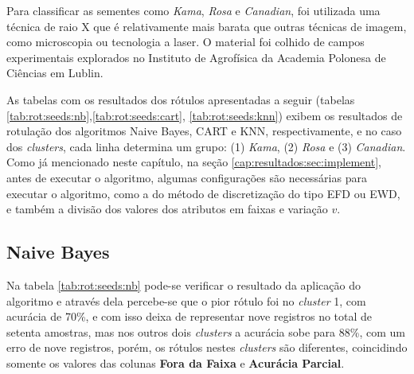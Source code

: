 Para classificar as sementes como \textit{Kama}, \textit{Rosa} e \textit{Canadian}, foi utilizada uma técnica de raio X que é relativamente mais barata que outras técnicas de imagem, como microscopia ou tecnologia a laser. O material foi colhido de campos experimentais explorados no Instituto de Agrofísica da Academia Polonesa de Ciências em Lublin. 

As tabelas com os resultados dos rótulos apresentadas a seguir (tabelas \ref{tab:rot:seeds:nb},\ref{tab:rot:seeds:cart}, \ref{tab:rot:seeds:knn}) exibem os resultados de rotulação dos algoritmos Naive Bayes, CART e KNN, respectivamente, e no caso dos \textit{clusters}, cada linha determina um grupo: (1) \textit{Kama}, (2) \textit{Rosa} e (3) \textit{Canadian}. Como já mencionado neste capítulo, na seção \ref{cap:resultados:sec:implement}, antes de executar o algoritmo, algumas configurações são necessárias para executar o algoritmo, como a do método de discretização do tipo EFD ou EWD, e também a divisão dos valores dos atributos em faixas e variação ${v}$.

\subsection{Naive Bayes} \label{cap:resultados:ssec:seed:nb}



Na tabela \ref{tab:rot:seeds:nb} pode-se verificar o resultado da aplicação do algoritmo e através dela percebe-se que o pior rótulo foi no \textit{cluster} 1, com acurácia de 70\%, e com isso deixa de representar nove registros no total de setenta amostras, mas nos outros dois \textit{clusters} a acurácia sobe para 88\%, com um erro de nove registros, porém, os rótulos nestes \textit{clusters} são diferentes, coincidindo somente os valores das colunas \textbf{Fora da Faixa} e \textbf{Acurácia Parcial}. 

